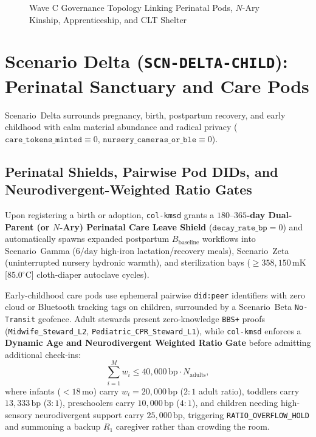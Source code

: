 \begin{figure}[htbp]
{%
}
\caption{Wave C Governance Topology Linking Perinatal Pods, $N$-Ary Kinship, Apprenticeship, and CLT Shelter}
\label{fig:wavec-choreography}
\end{figure}

\section{Scenario Delta (\texttt{SCN-DELTA-CHILD}): Perinatal Sanctuary and Care Pods}
\label{sec:wavec-delta}

Scenario~Delta surrounds pregnancy, birth, postpartum recovery, and early childhood with calm
material abundance and radical privacy ($\mathtt{care\_tokens\_minted} \equiv 0$,
$\mathtt{nursery\_cameras\_or\_ble} \equiv 0$).

\subsection{Perinatal Shields, Pairwise Pod DIDs, and Neurodivergent-Weighted Ratio Gates}

Upon registering a birth or adoption, \texttt{col-kmsd} grants a \textbf{$180\text{--}365$-day Dual-Parent
(or $N$-Ary) Perinatal Care Leave Shield} ($\mathtt{decay\_rate\_bp} = 0$) and automatically spawns
expanded postpartum $B_{\mathrm{baseline}}$ workflows into Scenario~Gamma ($6/\mathrm{day}$ high-iron
lactation/recovery meals), Scenario~Zeta (uninterrupted nursery hydronic warmth), and sterilization
bays ($\ge 358{,}150\,\mathrm{mK}$ [$85.0^\circ\mathrm{C}$] cloth-diaper autoclave cycles).

Early-childhood care pods use ephemeral pairwise \texttt{did:peer} identifiers with zero cloud or
Bluetooth tracking tags on children, surrounded by a Scenario~Beta \texttt{No-Transit} geofence.
Adult stewards present zero-knowledge \texttt{BBS+} proofs (\texttt{Midwife\_Steward\_L2},
\texttt{Pediatric\_CPR\_Steward\_L1}), while \texttt{col-kmsd} enforces a \textbf{Dynamic Age and
Neurodivergent Weighted Ratio Gate} before admitting additional check-ins:
\begin{equation}
    \sum_{i=1}^{M} w_i \le 40{,}000\,\mathrm{bp} \cdot N_{\mathrm{adults}},
\end{equation}
where infants ($<18\,\mathrm{mo}$) carry $w_i = 20{,}000\,\mathrm{bp}$ ($2{:}1$ adult ratio),
toddlers carry $13{,}333\,\mathrm{bp}$ ($3{:}1$), preschoolers carry $10{,}000\,\mathrm{bp}$
($4{:}1$), and children needing high-sensory neurodivergent support carry $25{,}000\,\mathrm{bp}$,
triggering \texttt{RATIO\_OVERFLOW\_HOLD} and summoning a backup $R_1$ caregiver rather than
crowding the room.

